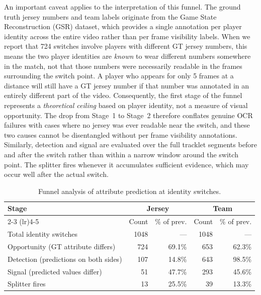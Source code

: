 An important caveat applies to the interpretation of this funnel. The ground truth jersey numbers and team labels originate from the Game State Reconstruction (GSR) dataset, which provides a single annotation per player identity across the entire video rather than per frame visibility labels. When we report that 724 switches involve players with different GT jersey numbers, this means the two player identities are \emph{known} to wear different numbers somewhere in the match, not that those numbers were necessarily readable in the frames surrounding the switch point. A player who appears for only 5 frames at a distance will still have a GT jersey number if that number was annotated in an entirely different part of the video. Consequently, the first stage of the funnel represents a \emph{theoretical ceiling} based on player identity, not a measure of visual opportunity. The drop from Stage~1 to Stage~2 therefore conflates genuine OCR failures with cases where no jersey was ever readable near the switch, and these two causes cannot be disentangled without per frame visibility annotations. Similarly, detection and signal are evaluated over the full tracklet segments before and after the switch rather than within a narrow window around the switch point. The splitter fires whenever it accumulates sufficient evidence, which may occur well after the actual switch.

\begin{table}[ht]
\centering
\caption{Funnel analysis of attribute prediction at identity switches.}
\label{tab:funnel-analysis}
\begin{tabular}{lrrrr}
\toprule
\textbf{Stage} & \multicolumn{2}{c}{\textbf{Jersey}} & \multicolumn{2}{c}{\textbf{Team}} \\
\cmidrule(lr){2-3} \cmidrule(lr){4-5}
 & Count & \% of prev. & Count & \% of prev. \\
\midrule
Total identity switches & 1048 & --- & 1048 & --- \\
Opportunity (GT attribute differs) & 724 & 69.1\% & 653 & 62.3\% \\
Detection (predictions on both sides) & 107 & 14.8\% & 643 & 98.5\% \\
Signal (predicted values differ) & 51 & 47.7\% & 293 & 45.6\% \\
Splitter fires & 13 & 25.5\% & 39 & 13.3\% \\
\bottomrule
\end{tabular}
\end{table}

